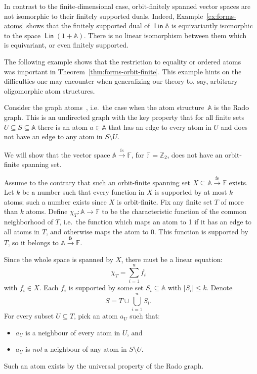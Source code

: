 \documentclass{theoretics}
\newcommand{\Int}{{\mathbb Z}}
\newcommand{\atoms}{\mathbb A}
\DeclareMathOperator{\lin}{\mathsf{Lin}}
\newcommand{\field}{\mathbb F}
\newcommand{\finsup}{\stackrel{\mathrm{fs}}{\to}}
\newcommand{\forms}[1]{#1 \finsup \field}
\begin{document}
In contrast to the finite-dimensional case, orbit-finitely spanned vector spaces are not isomorphic to their finitely supported duals. Indeed, Example~\ref{ex:forms-atoms} shows that
    the finitely supported dual of $\lin \atoms$ is equivariantly isomorphic to the space $\lin (1+ \atoms)$.
    There is no linear isomorphism between them which is equivariant, or even finitely supported.

The following example shows that the restriction to equality or ordered atoms was important in 
Theorem~\ref{thm:forms-orbit-finite}. This example hints on the difficulties one may encounter when generalizing 
our theory to, say, arbitrary oligomorphic atom structures.

\begin{example}
    \label{ex:counter-example-graph-atoms}
    Consider the graph atoms~\cite[Section 7.3.1]{bojanczyk_slightly2018}, i.e.~the case when the atom structure~$\atoms$ is the Rado graph. This is an undirected graph with the key property that for all finite sets $U\subseteq S\subseteq\atoms$ there is an atom $a\in\atoms$ that has an edge to every atom in $U$ and does not have an edge to any atom in $S\setminus U$.
    
We will show that the vector space $\forms \atoms$, for $\field=\Int_2$, does not have an orbit-finite spanning set.
    
Assume to the contrary that such an orbit-finite spanning set $X\subseteq \forms\atoms$ exists. Let $k$ be a number such that every function in $X$ is supported by at most $k$ atoms; such a number exists since $X$ is orbit-finite. Fix any finite set $T$ of more than $k$ atoms. Define $\chi_T : \atoms  \to \field $ to be the characteristic function of the common neighborhood of $T$, i.e.~the function which maps an atom to 1 if it has an edge to all atoms in $T$, and otherwise maps the atom to 0. This function is supported by $T$, so it belongs to $\forms \atoms$. 
    
Since the whole space is spanned by $X$, there must be a linear equation:
    \begin{equation}\label{eq:chigraph}
    	\chi_T = \sum_{i=1}^nf_i
    \end{equation}
with $f_i\in X$. Each $f_i$ is supported by some set $S_i\subseteq\atoms$ with $|S_i|\leq k$. Denote
\[
	S = T\cup\bigcup_{i=1}^nS_i.
\]
For every subset $U\subseteq T$, pick an atom $a_U$ such that:
\begin{itemize}
\item $a_U$ is a neighbour of every atom in $U$, and
\item $a_U$ is {\em not} a neighbour of any atom in $S\setminus U$.
\end{itemize}
Such an atom exists by the universal property of the Rado graph. 


\end{example}
\end{document}
